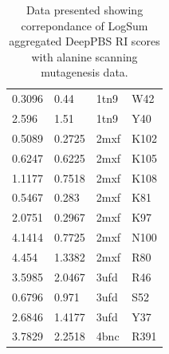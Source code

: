 \begin{table}[]
\begin{tabular}{|l|l|l|l|}
0.3096 & 0.44 & 1tn9 & W42 \\
2.596 & 1.51 & 1tn9 & Y40 \\
0.5089 & 0.2725 & 2mxf & K102 \\
0.6247 & 0.6225 & 2mxf & K105 \\
1.1177 & 0.7518 & 2mxf & K108 \\
0.5467 & 0.283 & 2mxf & K81 \\
2.0751 & 0.2967 & 2mxf & K97 \\
4.1414 & 0.7725 & 2mxf & N100 \\
4.454 & 1.3382 & 2mxf & R80 \\
3.5985 & 2.0467 & 3ufd & R46 \\
0.6796 & 0.971 & 3ufd & S52 \\
2.6846 & 1.4177 & 3ufd & Y37 \\
3.7829 & 2.2518 & 4bnc & R391\\
\hline
\end{tabular}%
\caption[Data presented showing correpondance of LogSum aggregated DeepPBS RI scores with alanine scanning mutagenesis data.]{Data presented showing correpondance of LogSum aggregated DeepPBS RI scores with alanine scanning mutagenesis data.}
\end{table}
